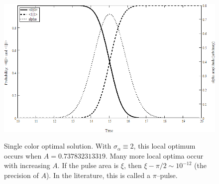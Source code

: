 \begin{figure}
\centering
\includegraphics[width=5.00in]
{solution_1/solution_1.png}\\
\caption[Single color optimal solution]{Single color optimal solution. With $\sigma_{\alpha}\equiv 2$, this local optimum occurs when $A=0.737832313319$. Many more local optima occur with increasing $A$. If the pulse area is $\xi$, then $\xi - \pi/2 \sim 10^{-12}$ (the precision of $A$). In the literature, this is called a $\pi$--pulse.}
\label{solution one}
\end{figure} 
